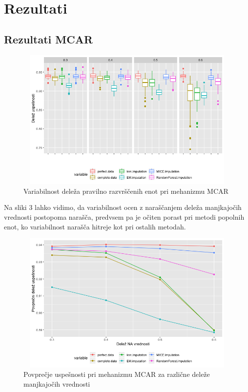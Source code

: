 \documentclass[12pt,a4paper]{article}
\begin{document}
\pagebreak

\section{Rezultati}

\subsection{Rezultati MCAR}

\begin{figure}[ht]
	\centering
	\includegraphics[width= 12cm, height = 7cm]{img/MCAR_boxplot.png}
	\caption{Variabilnost deleža pravilno razvrščenih enot pri mehanizmu MCAR} 
	\label{fig:3}
\end{figure}

\noindent Na sliki 3 lahko vidimo, da variabilnost ocen z naraščanjem deleža manjkajočih vrednosti postopoma narašča, predvsem pa je očiten porast pri metodi popolnih enot, ko variabilnost narašča hitreje kot pri ostalih metodah.




\begin{figure}[ht]
	\centering
	\includegraphics[width= 12cm, height = 7cm]{img/MCAR_mean_line.png}
	\caption{Povprečje uspešnosti pri mehanizmu MCAR za različne deleže manjkajočih vrednosti} 
	\label{fig:4}
\end{figure}
\end{document}
